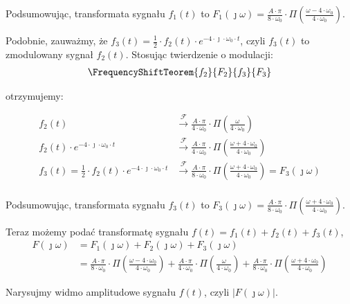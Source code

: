 \begin{task}
Podsumowując, transformata sygnału $f_1(t)$ to $F_1(\jmath \omega)= \frac{A \cdot \pi}{8 \cdot \omega_0} \cdot \Pi \left(\frac{\omega - 4 \cdot \omega_0}{4 \cdot \omega_0}\right)$.

Podobnie, zauważmy, że $f_3(t)=\frac{1}{2} \cdot f_2(t) \cdot e^{-4 \cdot \jmath \cdot \omega_0 \cdot t}$, czyli $f_3(t)$ to zmodulowany sygnał $f_2(t)$. Stosując twierdzenie o modulacji:
\begin{align*}
\FrequencyShiftTeorem{f_2}{F_2}{f_3}{F_3}
\end{align*}

otrzymujemy:

\begin{align*}
f_2(t) &\xrightarrow{\mathcal F} \frac{A \cdot \pi}{4 \cdot \omega_0} \cdot \Pi \left(\frac{\omega}{4 \cdot \omega_0}\right)\\
f_2(t) \cdot e^{-4 \cdot \jmath \cdot \omega_0 \cdot t} &\xrightarrow{\mathcal F} \frac{A \cdot \pi}{4 \cdot \omega_0} \cdot \Pi \left(\frac{\omega + 4 \cdot \omega_0}{4 \cdot \omega_0}\right)\\
f_3(t) = \frac{1}{2} \cdot f_2(t) \cdot e^{-4 \cdot \jmath \cdot \omega_0 \cdot t} &\xrightarrow{\mathcal F} \frac{A \cdot \pi}{8 \cdot \omega_0} \cdot \Pi \left(\frac{\omega + 4 \cdot \omega_0}{4 \cdot \omega_0}\right) = F_3(\jmath \omega)\\
\end{align*}

Podsumowując, transformata sygnału $f_3(t)$ to $F_3(\jmath \omega)= \frac{A \cdot \pi}{8 \cdot \omega_0} \cdot \Pi \left(\frac{\omega + 4 \cdot \omega_0}{4 \cdot \omega_0}\right)$.

Teraz możemy podać transformatę sygnału $f(t) = f_1(t)+f_2(t)+f_3(t)$,
\begin{align*}
F(\jmath \omega)&=F_1(\jmath \omega)+F_2(\jmath \omega)+F_3(\jmath \omega)\\
&=\frac{A \cdot \pi}{8 \cdot \omega_0} \cdot \Pi \left(\frac{\omega - 4 \cdot \omega_0}{4 \cdot \omega_0}\right) + \frac{A \cdot \pi}{4 \cdot \omega_0} \cdot \Pi \left(\frac{\omega}{4 \cdot \omega_0}\right) + \frac{A \cdot \pi}{8 \cdot \omega_0} \cdot \Pi \left(\frac{\omega + 4 \cdot \omega_0}{4 \cdot \omega_0}\right)
\end{align*}

Narysujmy widmo amplitudowe sygnału $f(t)$, czyli $\left|F(\jmath \omega)\right|$.

\begin{figure}[H]
	\centering
\end{figure}
\end{task}

